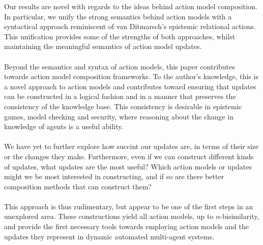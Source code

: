 Our results are novel with regards to the ideas behind action model composition.
In particular, we unify the strong semantics behind action models with a syntactical approach reminiscent of van
Ditmarsch's \cite{ditmarsch2002dga} epistemic relational actions.
This unification provides some of the strengths of both approaches, whilst maintaining the
meaningful semantics of action model updates.\\
\\
Beyond the semantics and syntax of action models, this paper contributes towards action model
composition frameworks.
To the author's knowledge, this is a novel approach to action models and contributes toward ensuring
that updates can be constructed in a logical fashion and in a manner that preserves the consistency
of the knowledge base.
This consistency is desirable in epistemic games, model checking and security, where reasoning about
the change in knowledge of agents is a useful ability.\\
\\
We have yet to further explore how succint our updates are, in terms of their size or the changes
they make.
Furthermore, even if we can construct different kinds of updates, what updates are the most useful?
Which action models or updates might we be most interested in constructing, and if so are there
better composition methods that can construct them?\\
\\
This approach is thus rudimentary, but appear to be one of the first steps in an unexplored area.
These constructions yield all action models, up to $n$-bisimilarity, and provide the first necessary
tools towards employing action models and the updates they represent in dynamic automated
multi-agent systems.
% 
% 
% 
